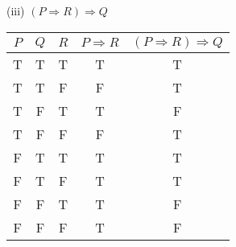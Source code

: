 \documentclass{article}
\begin{document}
(iii) $(P \Rightarrow R) \Rightarrow Q$\\
\begin{tabular}{|c|c|c|c|c|}
    \hline
    $P$ & $Q$ & $R$ & $P \Rightarrow R$ & $(P \Rightarrow R) \Rightarrow Q$ \\
    \hline
    T   & T   & T   & T                 & T                                 \\
    T   & T   & F   & F                 & T                                 \\
    T   & F   & T   & T                 & F                                 \\
    T   & F   & F   & F                 & T                                 \\
    F   & T   & T   & T                 & T                                 \\
    F   & T   & F   & T                 & T                                 \\
    F   & F   & T   & T                 & F                                 \\
    F   & F   & F   & T                 & F                                 \\
    \hline
\end{tabular}
\end{document}
